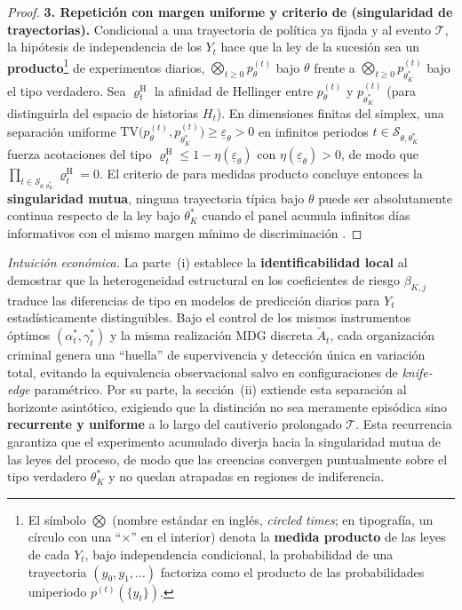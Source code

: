 \documentclass[12pt]{article}
\providecommand{\textcite}{\citet}
\theoremstyle{definition}
\theoremstyle{remark}
\newcommand{\1}{\mathbf{1}}
\begin{document}
\begin{proof}
\smallskip
\noindent\textbf{3. Repetición con margen uniforme y criterio de \textcite{Kakutani1948} \textup{(}singularidad de trayectorias\textup{)}.}
Condicional a una trayectoria de política ya fijada y al evento $\mathcal{T}$, la hipótesis de independencia de los $Y_t$ hace que la ley de la sucesión sea un \textbf{producto}\footnote{El símbolo $\bigotimes$ \textup{(}nombre estándar en inglés, \emph{circled times}; en tipografía, un círculo con una ``$\times$'' en el interior\textup{)} denota la \textbf{medida producto} de las leyes de cada $Y_t$, bajo independencia condicional, la probabilidad de una trayectoria $(y_0,y_1,\ldots)$ factoriza como el producto de las probabilidades uniperiodo $p^{(t)}(\{y_t\})$.} de experimentos diarios, $\bigotimes_{t\ge 0} p_\theta^{(t)}$ bajo $\theta$ frente a $\bigotimes_{t\ge 0} p_{\theta_K^\ast}^{(t)}$ bajo el tipo verdadero. Sea $\varrho_t^{\mathrm{H}}$ la afinidad de Hellinger entre $p_\theta^{(t)}$ y $p_{\theta_K^\ast}^{(t)}$ \textup{(}para distinguirla del espacio de historias $H_t$\textup{)}. En dimensiones finitas del simplex, una separación uniforme $\mathrm{TV}\bigl(p_\theta^{(t)},p_{\theta_K^\ast}^{(t)}\bigr)\ge \underline{\varepsilon}_\theta>0$ en infinitos periodos $t\in\mathcal{S}_{\theta,\theta_K^\ast}$ fuerza acotaciones del tipo $\varrho_t^{\mathrm{H}}\le 1-\eta(\underline{\varepsilon}_\theta)$ con $\eta(\underline{\varepsilon}_\theta)>0$, de modo que $\prod_{t\in\mathcal{S}_{\theta,\theta_K^\ast}} \varrho_t^{\mathrm{H}}=0$. El criterio de \textcite{Kakutani1948} para medidas producto concluye entonces la \textbf{singularidad mutua}, ninguna trayectoria típica bajo $\theta$ puede ser absolutamente continua respecto de la ley bajo $\theta_K^\ast$ cuando el panel acumula infinitos días informativos con el mismo margen mínimo de discriminación \textcite{Shiryaev2019Probability}.
\end{proof}

\medskip
\noindent\textit{Intuición económica.} 
La parte~\textup{(i)} establece la \textbf{identificabilidad local} al demostrar que la heterogeneidad estructural en los coeficientes de riesgo $\beta_{K,j}$ traduce las diferencias de tipo en modelos de predicción diarios para $Y_t$ estadísticamente distinguibles. Bajo el control de los mismos instrumentos óptimos $(\alpha_t^\ast, \gamma_t^\ast)$ y la misma realización MDG discreta $\tilde{A}_t$, cada organización criminal genera una ``huella'' de supervivencia y detección única en variación total, evitando la equivalencia observacional salvo en configuraciones de \textit{knife-edge} paramétrico. Por su parte, la sección~\textup{(ii)} extiende esta separación al horizonte asintótico, exigiendo que la distinción no sea meramente episódica sino \textbf{recurrente y uniforme} a lo largo del cautiverio prolongado $\mathcal{T}$. Esta recurrencia garantiza que el experimento acumulado diverja hacia la singularidad mutua de las leyes del proceso, de modo que las creencias convergen puntualmente sobre el tipo verdadero $\theta_K^\ast$ y no quedan atrapadas en regiones de indiferencia.
\end{document}
